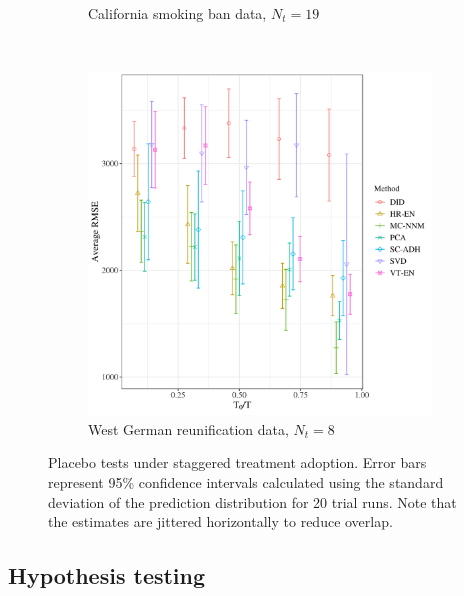 \documentclass[12pt]{article}
\begin{document}
\begin{figure}[htbp]
\begin{subfigure}[t]{0.48\textwidth}
		\caption{California smoking ban data, $N_t = 19$}
	\end{subfigure}
	~ 
	\begin{subfigure}[t]{0.48\textwidth}
		\centering
		\includegraphics[width=\textwidth]{plots/germany_N_16_T_44_numruns_20_num_treated_8_simultaneuous_0.png}
		\caption{West German reunification data, $N_t = 8$}
	\end{subfigure}
	\caption{Placebo tests under staggered treatment adoption. Error bars represent 95\% confidence intervals calculated using the standard deviation of the prediction distribution for 20 trial runs. Note that the estimates are jittered horizontally to reduce overlap. \label{synth-stag}} 
\end{figure}

\subsection{Hypothesis testing} \label{hyp-test}
\end{document}
